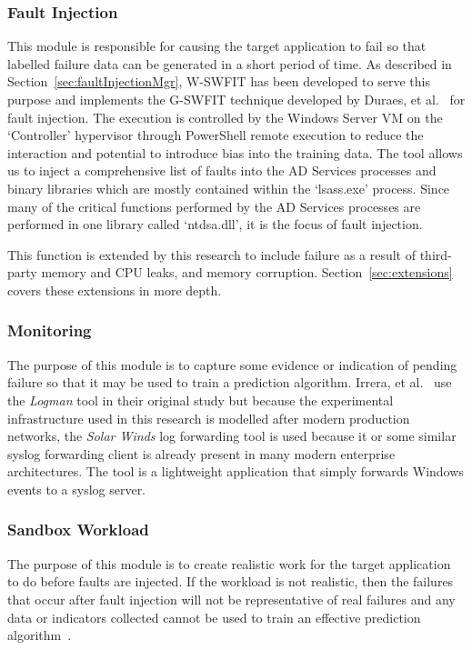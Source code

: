 \subsubsection{Fault Injection} \label{sec:faultInjectionTool} 
This module is responsible for causing the target application to fail so that
labelled failure data can be generated in a short period of time.  As described
in Section~\ref{sec:faultInjectionMgr}, \ac{W-SWFIT} has been developed to
serve this purpose and implements the \ac{G-SWFIT} technique developed by
Duraes, et al.~\cite{gswfit} for fault injection.  The execution is controlled
by the Windows Server \ac{VM} on the `Controller' hypervisor through PowerShell
remote execution to reduce the interaction and potential to introduce bias into
the training data.  The tool allows us to inject a comprehensive list of faults
into the \ac{AD} Services processes and binary libraries which are mostly
contained within the `lsass.exe' process.  Since many of the critical functions
performed by the \ac{AD} Services processes are performed in one library called
`ntdsa.dll', it is the focus of fault injection.

This function is extended by this research to include failure as a result of
third-party memory and \ac{CPU} leaks, and memory corruption.
Section~\ref{sec:extensions} covers these extensions in more depth.

\subsubsection{Monitoring} \label{sec:sandboxMonitoringTool} 
The purpose of this module is to capture some evidence or indication of pending
failure so that it may be used to train a prediction algorithm.  Irrera, et
al.~\cite{irrera2015} use the \emph{Logman} tool in their original study but
because the experimental infrastructure used in this research is modelled after
modern production networks, the \emph{Solar Winds} log forwarding tool is used
because it or some similar syslog forwarding client is already present in many
modern enterprise architectures.  The tool is a lightweight application that
simply forwards Windows events to a syslog server.

\subsubsection{Sandbox Workload}  \label{sec:sandboxWorkload} 
The purpose of this module is to create realistic work for the target
application to do before faults are injected.  If the workload is not
realistic, then the failures that occur after fault injection will not be
representative of real failures and any data or indicators collected cannot be
used to train an effective prediction
algorithm~\cite{cotroneo2012,kikuchi2014,irrera2015}.

